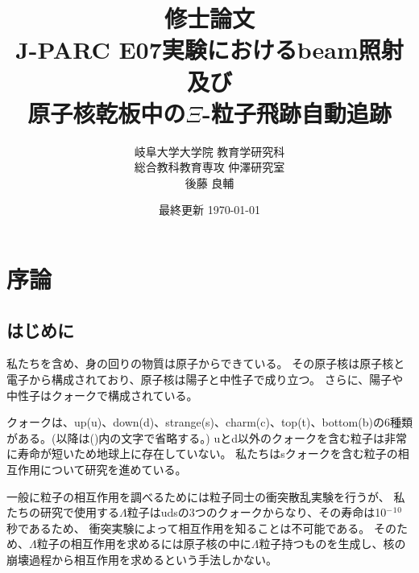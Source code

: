 \documentclass[12pt,a4paper]{jarticle}
\begin{document}
\begin{titlepage}
\title{\vspace{60mm} \LARGE 修士論文\vspace{10mm}\\J-PARC E07実験におけるbeam照射及び\\原子核乾板中の$\Xi$-粒子飛跡自動追跡}
\author{\Large 岐阜大学大学院 教育学研究科 \\ \vspace{5mm}
\Large 総合教科教育専攻 仲澤研究室 \\ \vspace{5mm}
\LARGE 後藤 良輔}
\date{最終更新 \today}
\maketitle
\thispagestyle{empty} %
\end{titlepage}

\thispagestyle{empty} %
\tableofcontents
\newpage
\section{序論}
\subsection{はじめに}
私たちを含め、身の回りの物質は原子からできている。
その原子核は原子核と電子から構成されており、原子核は陽子と中性子で成り立つ。
さらに、陽子や中性子はクォークで構成されている。
\par
クォークは、up(u)、down(d)、strange(s)、charm(c)、top(t)、bottom(b)の6種類がある。(以降は()内の文字で省略する。)
uとd以外のクォークを含む粒子は非常に寿命が短いため地球上に存在していない。
私たちはsクォークを含む粒子の相互作用について研究を進めている。
\par
一般に粒子の相互作用を調べるためには粒子同士の衝突散乱実験を行うが、
私たちの研究で使用する$\Lambda$粒子はudsの3つのクォークからなり、その寿命は10$^-$$^1$$^0$秒であるため、
衝突実験によって相互作用を知ることは不可能である。
そのため、$\Lambda$粒子の相互作用を求めるには原子核の中に$\Lambda$粒子持つものを生成し、核の崩壊過程から相互作用を求めるという手法しかない。
\end{document}
